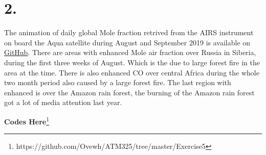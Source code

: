 \section*{2.}
The animation of daily global  Mole fraction retrived from the AIRS
instrument on board the Aqua satellite during August and September 2019
is available on
\href{https://github.com/Ovewh/ATM325/tree/master/Exercise5/CO_Global_2019_Aug.gif}{GitHub}.
There are areas with enhanced  Mole air fraction 
over Russia in Siberia, during the first three weeks of August. Which is the due
to large forest fire in the area at the time. There is also enhanced CO over
central Africa during the whole two month period also caused by a large forest
fire. The last region with enhanced  is over the Amazon rain forest, the
burning of the Amazon rain forest got a lot of media attention last year. 
 

\textbf{Codes Here}\footnote{https://github.com/Ovewh/ATM325/tree/master/Exercise5}
